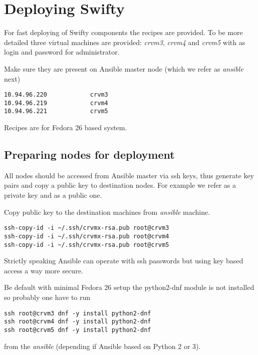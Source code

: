 \chapter{Deploying Swifty}
\label{ch:deploy}

For fast deploying of Swifty components the 
recipes are provided. To be more detailed three virtual machines are provided:
\emph{crvm3}, \emph{crvm4} and \emph{crvm5} with  as login and
password for administrator.

Make sure they are present on Ansible master node
(which we refer as \emph{ansible} next) 

\begin{lstlisting}
10.94.96.220            crvm3
10.94.96.219            crvm4
10.94.96.221            crvm5
\end{lstlisting}

Recipes are for Fedora 26 based system.

\section{Preparing nodes for deployment}
\label{sec:deploy-prep}

All nodes should be accessed from Ansible master via ssh keys, thus generate
key pairs and copy a public key to destination nodes. For example we refer
 as a private key and  as a public one.

Copy public key to the destination machines from \emph{ansible} machine.

\begin{lstlisting}
ssh-copy-id -i ~/.ssh/crvmx-rsa.pub root@crvm3
ssh-copy-id -i ~/.ssh/crvmx-rsa.pub root@crvm4
ssh-copy-id -i ~/.ssh/crvmx-rsa.pub root@crvm5
\end{lstlisting}

Strictly speaking Ansible can operate with ssh passwords but using
key based access a way more secure.

Be default with minimal Fedora 26 setup the python2-dnf module is not installed
so probably one have to run

\begin{lstlisting}
ssh root@crvm3 dnf -y install python2-dnf
ssh root@crvm4 dnf -y install python2-dnf
ssh root@crvm5 dnf -y install python2-dnf
\end{lstlisting}

from the \emph{ansible} (depending if Ansible based on Python 2 or 3).


